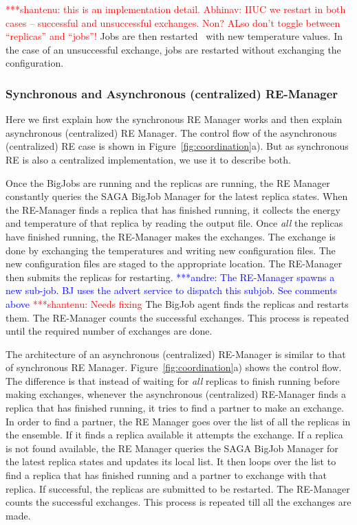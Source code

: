 \documentclass{rspublic}
\newcommand{\jhanote}[1]{ {\textcolor{red} { ***shantenu: #1 }}}
\newcommand{\alnote}[1]{ {\textcolor{blue} { ***andre: #1 }}}
\newcommand{\alnote}[1]{}
\newcommand{\jhanote}[1]{}
\begin{document}
\jhanote{this is an implementation detail. Abhinav: IIUC we restart in
  both cases -- successful and unsuccessful exchanges. Non? ALso don't
  toggle between ``replicas'' and ``jobs''!}  Jobs are then
restarted~\citep{Luckow:2008fp} with new temperature values.  In the
case of an unsuccessful exchange, jobs are restarted without
exchanging the configuration.

\subsubsection{Synchronous and Asynchronous (centralized) RE-Manager}

Here we first explain how the synchronous RE Manager works and then
explain asynchronous (centralized) RE Manager. The control flow of the
asynchronous (centralized) RE case is shown in
Figure~\ref{fig:coordination}a). But as synchronous RE is also a
centralized implementation, we use it to describe
both. %

Once the BigJobs are running and the replicas are running, the RE Manager constantly queries the SAGA BigJob Manager for the latest replica states. %
When the RE-Manager finds a replica that has finished running, it
collects the energy and temperature of that replica by reading the
output file. Once \emph{all} the replicas have finished running, the
RE-Manager makes the exchanges. The exchange is done by exchanging the
temperatures and writing new configuration files. The new
configuration files are staged to the appropriate location. The
RE-Manager then submits the replicas for restarting.  \alnote{The
  RE-Manager spawns a new sub-job. BJ uses the advert service to
  dispatch this subjob. See comments above} \jhanote{Needs fixing}The
BigJob agent finds the replicas and restarts them. The RE-Manager
counts the successful exchanges. This process is repeated until the
required number of exchanges are done.

The architecture of an asynchronous (centralized) RE-Manager is
similar to that of synchronous RE Manager.
Figure~\ref{fig:coordination}a) shows the control flow. The difference
is that instead of waiting for \emph{all} replicas to finish running
before making exchanges, whenever the asynchronous (centralized)
RE-Manager finds a replica that has finished running, it tries to find
a partner to make an exchange. In order to find a partner, the RE
Manager goes over the list of all the replicas in the ensemble. If it
finds a replica available it attempts the exchange. If a replica is
not found available, the RE Manager queries the SAGA BigJob Manager
for the latest replica states and updates its local list. It then
loops over the list to find a replica that has finished running and a
partner to exchange with that replica.  If successful, the replicas
are submitted to be restarted. %
The RE-Manager counts the successful
exchanges. This process is repeated till all the exchanges are made.
\end{document}
